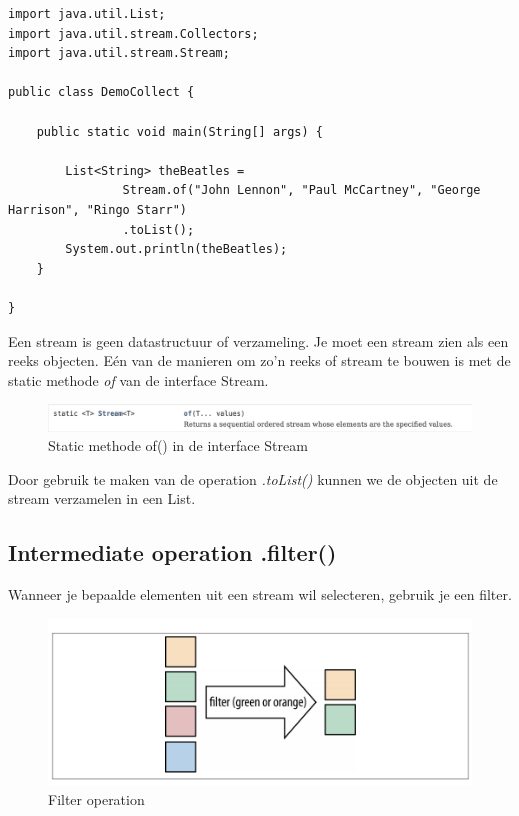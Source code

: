 \begin{lstlisting}
import java.util.List;
import java.util.stream.Collectors;
import java.util.stream.Stream;

public class DemoCollect {

	public static void main(String[] args) {

		List<String> theBeatles = 
				Stream.of("John Lennon", "Paul McCartney", "George Harrison", "Ringo Starr")
				.toList();
		System.out.println(theBeatles);
	}

}
\end{lstlisting}

Een stream is geen datastructuur of verzameling. Je moet een stream zien als een reeks objecten. E\'en van de manieren om zo'n reeks of stream te bouwen is met de static methode \textit{of} van de interface Stream.

\begin{figure}[H]
  \includegraphics[width=\linewidth]{images/h6/stream_of.png}
  \caption{Static methode of() in de interface Stream}
  \label{fig:stream_of}
\end{figure}

Door gebruik te maken van de operation \textit{.toList()} kunnen we de objecten uit de stream verzamelen in een List.

\subsection{Intermediate operation .filter()}

Wanneer je bepaalde elementen uit een stream wil selecteren, gebruik je een filter. 

\begin{figure}[H]
  \includegraphics[width=\linewidth]{images/h6/illustration_filter.png}
  \caption{Filter operation}
  \label{fig:filter_operation}
\end{figure}

